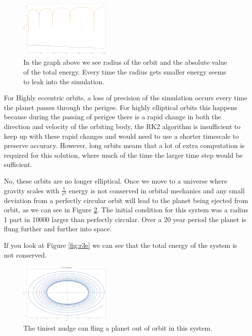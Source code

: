 \documentclass{article}
\begin{document}
\begin{figure}[h]
	\begin{center}
		\includegraphics[width=0.4\textwidth]{ver.pdf}
	\end{center}
	\caption{In the graph above we see radius of the orbit and the absolute value of the total energy. Every time the radius gets smaller energy seems to leak into the simulation.}
	\label{fig:veo}
\end{figure}

For Highly eccentric orbits, a loss of precision of the simulation occurs every time the planet passes through the perigee. For highly elliptical orbits this happens because during the passing of perigee there is a rapid change in both the direction and velocity of the orbiting body, the RK2 algorithm is insufficient to keep up with these rapid changes and would need to use a shorter timescale to preserve accuracy. However, long orbits means that a lot of extra computation is required for this solution, where much of the time the larger time step would be sufficient.

\pagebreak
\bigskip
{}
\medskip

No, these orbits are no longer elliptical. Once we move to a universe where gravity scales with $\frac{1}{r^3}$ energy is not conserved in orbital mechanics and any small deviation from a perfectly circular orbit will lead to the planet being ejected from orbit, as we can see in Figure \ref{fig:r3}. The initial condition for this system was a radius 1 part in 10000 larger than perfectly circular. Over a 20 year period the planet is flung further and further into space.

If you look at Figure \ref{fig:r3e} we can see that the total energy of the system is not conserved.

\begin{figure}[h]
	\begin{center}
		\includegraphics[width=0.4\textwidth]{r3.pdf}
	\end{center}
	\caption{The tiniest nudge can fling a planet out of orbit in this system.}
	\label{fig:r3}
\end{figure}
\end{document}
